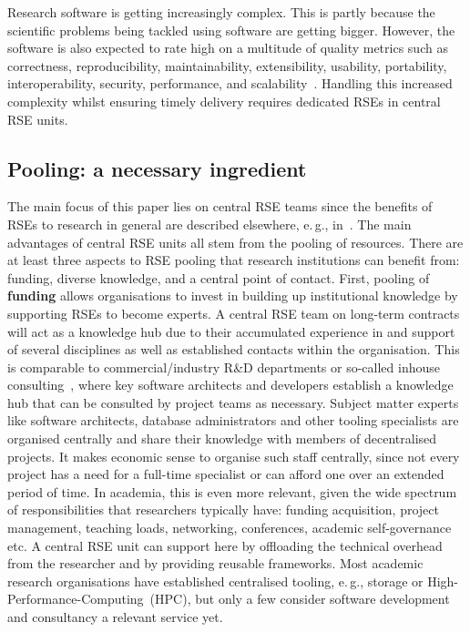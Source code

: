 \documentclass[a4paper]{article}
\newcommand*{\eg}{e.\,g.,\xspace}
\begin{document}
Research software is getting increasingly complex.
This is partly because the scientific problems being tackled using software are getting bigger.
However, the software is also expected to rate high on a multitude of quality metrics such as correctness, reproducibility, maintainability, extensibility, usability, portability, interoperability, security, performance, and scalability~\autocite[Chapter 16]{Schulmeyer2008}.
Handling this increased complexity whilst ensuring timely delivery requires dedicated RSEs in central RSE units.

\subsection{Pooling: a necessary ingredient}
\label{subsec:pooling}
The main focus of this paper lies on central RSE teams since the benefits of RSEs to research in general are described elsewhere, \eg{} in~\autocite{Anzt2021}.
The main advantages of central RSE units all stem from the pooling of resources.
There are at least three aspects to RSE pooling that research institutions can benefit from: funding, diverse knowledge, and a central point of contact.
First, pooling of \textbf{funding} allows organisations to invest in building up institutional knowledge by supporting RSEs to become experts.
A central RSE team on long-term contracts will act as a knowledge hub due to their accumulated experience in and support of several disciplines as well as established contacts within the organisation.
This is comparable to commercial/industry R\&D departments or so-called inhouse consulting~\autocite{Grima_2011}, where key software architects and developers establish a knowledge hub that can be consulted by project teams as necessary.
Subject matter experts like software architects, database administrators and other tooling specialists are organised centrally and share their knowledge with members of decentralised projects.
It makes economic sense to organise such staff centrally, since not every project has a need for a full-time specialist or can afford one over an extended period of time.
In academia, this is even more relevant, given the wide spectrum of responsibilities that researchers typically have: funding acquisition, project management, teaching loads, networking, conferences, academic self-governance etc.
A central RSE unit can support here by offloading the technical overhead from the researcher and by providing reusable frameworks.
Most academic research organisations have established centralised tooling, \eg{} storage or High-Performance-Computing\ (HPC), but only a few consider software development and consultancy a relevant service yet.
\end{document}
